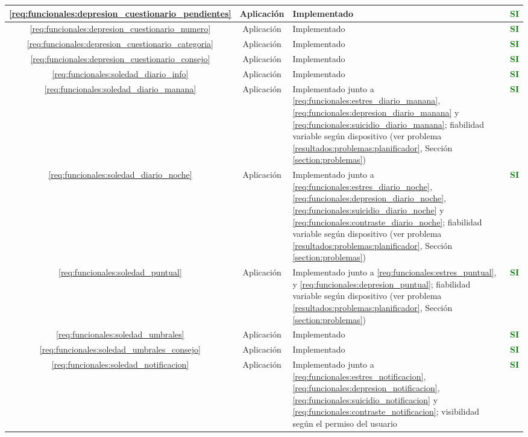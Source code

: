 \begin{xltabular}{\textwidth}{|c|c|X|c|}
        \hline
        \ref{req:funcionales:depresion_cuestionario_pendientes} & Aplicación & Implementado & \textcolor{green}{\textbf{SI}} \\
        \hline
        \ref{req:funcionales:depresion_cuestionario_numero} & Aplicación & Implementado & \textcolor{green}{\textbf{SI}} \\
        \hline
        \ref{req:funcionales:depresion_cuestionario_categoria} & Aplicación & Implementado & \textcolor{green}{\textbf{SI}} \\
        \hline
        \ref{req:funcionales:depresion_cuestionario_consejo} & Aplicación & Implementado & \textcolor{green}{\textbf{SI}} \\
        \hline
        \ref{req:funcionales:soledad_diario_info} & Aplicación & Implementado & \textcolor{green}{\textbf{SI}} \\
        \hline
        \ref{req:funcionales:soledad_diario_manana} & Aplicación & Implementado junto a \ref{req:funcionales:estres_diario_manana}, \ref{req:funcionales:depresion_diario_manana} y \ref{req:funcionales:suicidio_diario_manana}; fiabilidad variable según dispositivo (ver problema \ref{resultados:problemas:planificador}, Sección \ref{section:problemas}) & \textcolor{green}{\textbf{SI}} \\
        \hline
        \ref{req:funcionales:soledad_diario_noche} & Aplicación & Implementado junto a \ref{req:funcionales:estres_diario_noche}, \ref{req:funcionales:depresion_diario_noche},  \ref{req:funcionales:suicidio_diario_noche} y \ref{req:funcionales:contraste_diario_noche}; fiabilidad variable según dispositivo (ver problema \ref{resultados:problemas:planificador}, Sección \ref{section:problemas}) & \textcolor{green}{\textbf{SI}} \\
        \hline
        \ref{req:funcionales:soledad_puntual} & Aplicación & Implementado junto a \ref{req:funcionales:estres_puntual}, y \ref{req:funcionales:depresion_puntual}; fiabilidad variable según dispositivo (ver problema \ref{resultados:problemas:planificador}, Sección \ref{section:problemas}) & \textcolor{green}{\textbf{SI}} \\
        \hline
        \ref{req:funcionales:soledad_umbrales} & Aplicación & Implementado & \textcolor{green}{\textbf{SI}} \\
        \hline
        \ref{req:funcionales:soledad_umbrales_consejo} & Aplicación & Implementado & \textcolor{green}{\textbf{SI}} \\
        \hline
        \ref{req:funcionales:soledad_notificacion} & Aplicación & Implementado junto a \ref{req:funcionales:estres_notificacion}, \ref{req:funcionales:depresion_notificacion}, \ref{req:funcionales:suicidio_notificacion} y \ref{req:funcionales:contraste_notificacion}; visibilidad según el permiso del usuario & \textcolor{green}{\textbf{SI}} \\

\end{xltabular}
